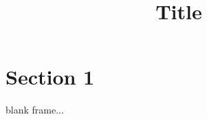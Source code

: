 \documentclass[english, aspectratio=169]{beamer}
\title{
  Title
}
\institute{
  \textbf{Presenting author},
  other author,
  \\ Aarhus University
}
\begin{document}
\begin{frame}
  \titlepage
\end{frame}

\blankframe

\section{Section 1}
\begin{frame}
  blank frame...
\end{frame}
\end{document}
